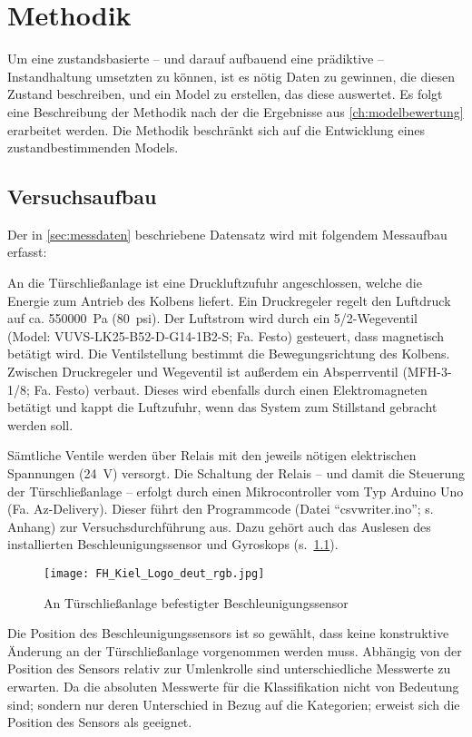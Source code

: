 \chapter{Methodik}
\label{ch:methodik}
Um eine zustandsbasierte -- und darauf aufbauend eine prädiktive -- Instandhaltung umsetzten zu können, ist es nötig Daten zu gewinnen, die diesen Zustand beschreiben, und ein Model zu erstellen, das diese auswertet. Es folgt eine Beschreibung der Methodik nach der die Ergebnisse aus \cref{ch:modelbewertung} erarbeitet werden. Die Methodik beschränkt sich auf die Entwicklung eines zustandbestimmenden Models.
\section{Versuchsaufbau}
\label{sec:versuchsaufbau}
Der in \cref{sec:messdaten} beschriebene Datensatz wird mit folgendem Messaufbau erfasst:

An die Türschließanlage ist eine Druckluftzufuhr angeschlossen, welche die Energie zum Antrieb des Kolbens liefert. Ein Druckregeler regelt den Luftdruck auf ca. \SI{550000}{\pascal} (\SI{80}{psi}). Der Luftstrom wird durch ein 5/2-Wegeventil (Model: VUVS-LK25-B52-D-G14-1B2-S; Fa. Festo) gesteuert, dass magnetisch betätigt wird. Die Ventilstellung bestimmt die Bewegungsrichtung des Kolbens. Zwischen Druckregeler und Wegeventil ist außerdem ein Absperrventil (MFH-3-1/8; Fa. Festo) verbaut. Dieses wird ebenfalls durch einen Elektromagneten betätigt und kappt die Luftzufuhr, wenn das System zum Stillstand gebracht werden soll.

Sämtliche Ventile werden über Relais mit den jeweils nötigen elektrischen Spannungen (\SI{24}{\volt}) versorgt. Die Schaltung der Relais -- und damit die Steuerung der Türschließanlage -- erfolgt durch einen Mikrocontroller vom Typ Arduino Uno (Fa. Az-Delivery). Dieser führt den Programmcode (Datei \enquote{csvwriter.ino}; s. Anhang) zur Versuchsdurchführung aus.  Dazu gehört auch das Auslesen des installierten Beschleunigungssensor und Gyroskops (s.~\cref{fig:beschleunigungssensor}). 

\begin{figure}
	\centering
	\texttt{[image: FH\_Kiel\_Logo\_deut\_rgb.jpg]}
	\caption{An Türschließanlage befestigter Beschleunigungssensor}
	\label{fig:beschleunigungssensor}
\end{figure}

Die Position des Beschleunigungssensors ist so gewählt, dass keine konstruktive Änderung an der Türschließanlage vorgenommen werden muss. Abhängig von der Position des Sensors relativ zur Umlenkrolle sind unterschiedliche Messwerte zu erwarten. Da die absoluten Messwerte für die Klassifikation nicht von Bedeutung sind; sondern nur deren Unterschied in Bezug auf die Kategorien; erweist sich die Position des Sensors als geeignet.


